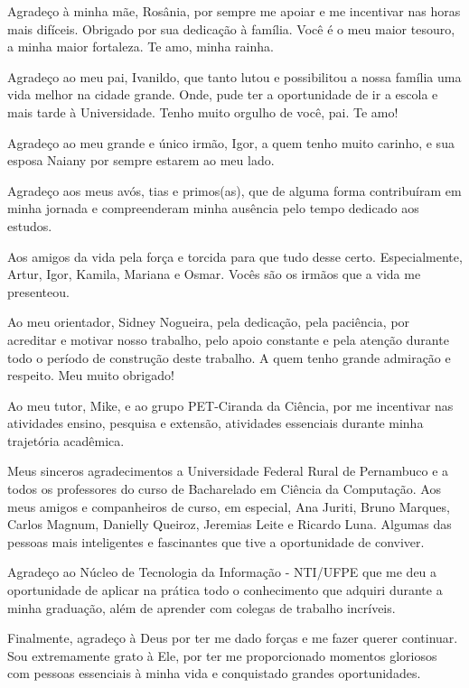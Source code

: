 \begin{agradecimentos}
Agradeço à minha mãe, Rosânia, por sempre me apoiar e me incentivar nas horas mais difíceis. Obrigado por sua dedicação à família. Você é o meu maior tesouro, a minha maior fortaleza. Te amo, minha rainha.

Agradeço ao meu pai, Ivanildo, que tanto lutou e possibilitou a nossa família uma vida melhor na cidade grande. Onde, pude ter a oportunidade de ir a escola e mais tarde à Universidade. Tenho muito orgulho de você, pai. Te amo!

Agradeço ao meu grande e único irmão, Igor, a quem tenho muito carinho, e sua esposa Naiany por sempre estarem ao meu lado.

Agradeço aos meus avós, tias e primos(as), que de alguma forma contribuíram em minha jornada e compreenderam minha ausência pelo tempo dedicado aos estudos.

Aos amigos da vida pela força e torcida para que tudo desse certo. Especialmente, Artur, Igor, Kamila, Mariana e Osmar. Vocês são os irmãos que a vida me presenteou.

Ao meu orientador, Sidney Nogueira, pela dedicação, pela paciência, por acreditar e motivar nosso trabalho, pelo apoio constante e pela atenção durante todo o período de construção deste trabalho. A quem tenho grande admiração e respeito. Meu muito obrigado!

Ao meu tutor, Mike, e ao grupo PET-Ciranda da Ciência, por me incentivar nas atividades ensino, pesquisa e extensão, atividades essenciais durante minha trajetória acadêmica.

Meus sinceros agradecimentos a Universidade Federal Rural de Pernambuco e a todos os professores do curso de Bacharelado em Ciência da Computação. Aos meus amigos e companheiros de curso, em especial, Ana Juriti, Bruno Marques, Carlos Magnum, Danielly Queiroz, Jeremias Leite e Ricardo Luna. Algumas das pessoas mais inteligentes e fascinantes que tive a oportunidade de conviver.

Agradeço ao Núcleo de Tecnologia da Informação - NTI/UFPE que me deu a oportunidade de aplicar na prática todo o conhecimento que adquiri durante a minha graduação, além de aprender com colegas de trabalho incríveis.

Finalmente, agradeço à Deus por ter me dado forças e me fazer querer continuar. Sou extremamente grato à Ele, por ter me proporcionado momentos gloriosos com pessoas essenciais à minha vida e conquistado grandes oportunidades.


\end{agradecimentos}

